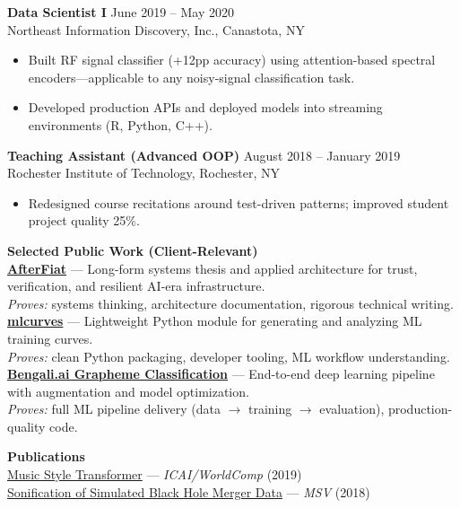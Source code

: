 \documentclass[10.5pt]{res}
\begin{document}
\begin{resume}
{\bf Data Scientist I} \hfill June 2019 -- May 2020\\
Northeast Information Discovery, Inc., Canastota, NY \\
\begin{itemize}\rightmargin=0cm \itemsep 2pt
    \item Built RF signal classifier (+12pp accuracy) using attention-based spectral encoders---applicable to any noisy-signal classification task.
    \item Developed production APIs and deployed models into streaming environments (R, Python, C++).
\end{itemize}

{\bf Teaching Assistant (Advanced OOP)} \hfill August 2018 -- January 2019\\
Rochester Institute of Technology, Rochester, NY \\
\begin{itemize}\rightmargin=0cm \itemsep 2pt
    \item Redesigned course recitations around test-driven patterns; improved student project quality 25\%.
\end{itemize}

{\bf Selected Public Work (Client-Relevant)} \\

\textbf{\href{https://afterfiat.xyz}{AfterFiat}} --- Long-form systems thesis and applied architecture for trust, verification, and resilient AI-era infrastructure.\\
\textit{Proves:} systems thinking, architecture documentation, rigorous technical writing.\\[0.15cm]
\textbf{\href{https://github.com/ifrit98/mlcurves}{mlcurves}} --- Lightweight Python module for generating and analyzing ML training curves.\\
\textit{Proves:} clean Python packaging, developer tooling, ML workflow understanding.\\[0.15cm]
\textbf{\href{https://github.com/ifrit98/begnaliai}{Bengali.ai Grapheme Classification}} --- End-to-end deep learning pipeline with augmentation and model optimization.\\
\textit{Proves:} full ML pipeline delivery (data $\rightarrow$ training $\rightarrow$ evaluation), production-quality code.
\vspace{.27 cm}

{\bf Publications} \\
\href{https://drive.google.com/file/d/1Xps3u00zFacalEtLFYzkAAy0NfmRkHLB/view?usp=sharing}{Music Style Transformer} --- \textit{ICAI/WorldComp} (2019)\\[0.1cm]
\href{https://drive.google.com/file/d/1pdxPst1CBMQQrgR2OGiBcKQgI_Hzg6gX/view?usp=sharing}{Sonification of Simulated Black Hole Merger Data} --- \textit{MSV} (2018)
\vspace{.27 cm}


\end{resume}
\end{document}
